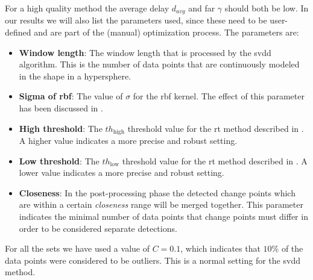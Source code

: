 For a high quality method the average delay $d_{avg}$ and \gls{far} $\gamma$ should both be low.
In our results we will also list the parameters used, since these need to be user-defined and are part of the (manual) optimization process.
The parameters are:
\begin{itemize}
  \item \textbf{Window length}: The window length that is processed by the \gls{svdd} algorithm. This is the number of data points that are continuously modeled in the shape in a hypersphere.
  \item \textbf{Sigma of \gls{rbf}}: The value of $\sigma$ for the \gls{rbf} kernel. The effect of this parameter has been discussed in .
  \item \textbf{High threshold}: The $th_\text{high}$ threshold value for the \gls{rt} method described in . A higher value indicates a more precise and robust setting.
  \item \textbf{Low threshold}: The $th_\text{low}$ threshold value for the \gls{rt} method described in . A lower value indicates a more precise and robust setting.
  \item \textbf{Closeness}: In the post-processing phase the detected change points which are within a certain \emph{closeness} range will be merged together. This parameter indicates the minimal number of data points that change points must differ in order to be considered separate detections.
\end{itemize}
For all the sets we have used a value of $C = 0.1$, which indicates that $10\%$ of the data points were considered to be outliers.
This is a normal setting for the \gls{svdd} method.